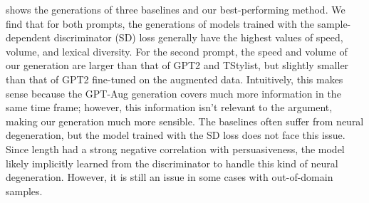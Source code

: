  shows the generations of three baselines and our best-performing method. We find that for both prompts, the generations of models trained with the sample-dependent discriminator (SD) loss generally have the highest values of speed, volume, and lexical diversity. For the second prompt, the speed and volume of our generation are larger than that of GPT2 and TStylist, but slightly smaller than that of GPT2 fine-tuned on the augmented data. Intuitively, this makes sense because the GPT-Aug generation covers much more information in the same time frame; however, this information isn't relevant to the argument, making our generation much more sensible. The baselines often suffer from neural degeneration, but the model trained with the SD loss does not face this issue. Since length had a strong negative correlation with persuasiveness, the model likely implicitly learned from the discriminator to handle this kind of neural degeneration. However, it is still an issue in some cases with out-of-domain samples.






